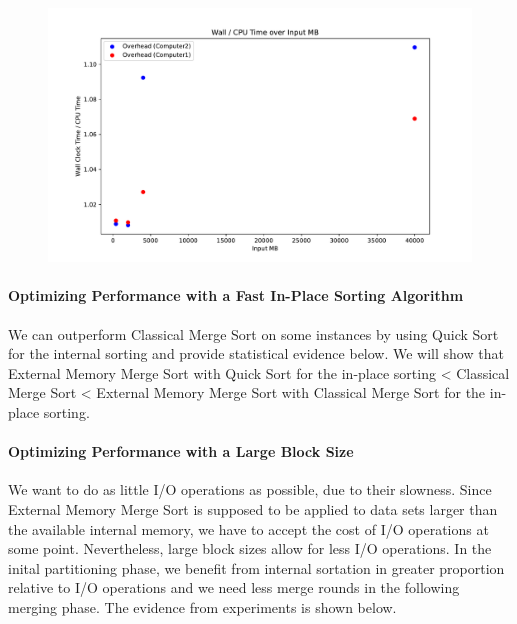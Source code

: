 \documentclass[twocolumn]{article}
\begin{document}
\begin{figure}[htb]
    \begin{minipage}{0.475 \textwidth}
        \centering
        \includegraphics[width=\textwidth]{./res/overhead_ratio.pdf}
        \caption{}
        \label{fig:overhead_ratio.pdf}
    \end{minipage}
\end{figure}

\paragraph*{Optimizing Performance with a Fast In-Place Sorting Algorithm}
We can outperform Classical Merge Sort on some instances by using Quick Sort for the internal sorting and provide statistical evidence below.
We will show that External Memory Merge Sort with Quick Sort for the in-place sorting < Classical Merge Sort < External Memory Merge Sort with Classical Merge Sort for the in-place sorting.

\paragraph*{Optimizing Performance with a Large Block Size}
We want to do as little I/O operations as possible, due to their slowness. Since External Memory Merge Sort is supposed to be applied to data sets larger than the available internal memory,
we have to accept the cost of I/O operations at some point. Nevertheless, large block sizes allow for less I/O operations. In the inital partitioning phase, we benefit from internal sortation
in greater proportion relative to I/O operations and we need less merge rounds in the following merging phase.
The evidence from experiments is shown below.
\end{document}
